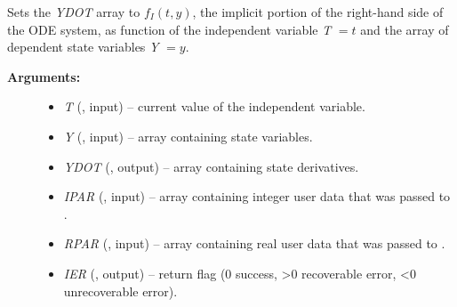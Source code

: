 \documentclass[letterpaper,10pt,english]{sphinxmanual}
\begin{document}
\begin{fulllineitems}
\label{f_interface/Usage:f/_/FARKIFUN}
Sets the \emph{YDOT} array to $f_I(t,y)$, the implicit portion of
the right-hand side of the ODE system, as function of the
independent variable \emph{T} $=t$ and the array of dependent state
variables \emph{Y} $=y$.
\begin{description}
\item[{\textbf{Arguments:}}] \leavevmode\begin{itemize}
\item {} 
\emph{T} (, input) -- current value of the independent variable.

\item {} 
\emph{Y} (, input) -- array containing state variables.

\item {} 
\emph{YDOT} (, output) -- array containing state derivatives.

\item {} 
\emph{IPAR} (, input) -- array containing integer user
data that was passed to {\hyperref[f_interface/Usage:f/_/FARKMALLOC]{}}.

\item {} 
\emph{RPAR} (, input) -- array containing real user
data that was passed to {\hyperref[f_interface/Usage:f/_/FARKMALLOC]{}}.

\item {} 
\emph{IER} (, output) -- return flag (0 success, \textgreater{}0
recoverable error, \textless{}0 unrecoverable error).

\end{itemize}

\end{description}

\end{fulllineitems}

\end{document}
